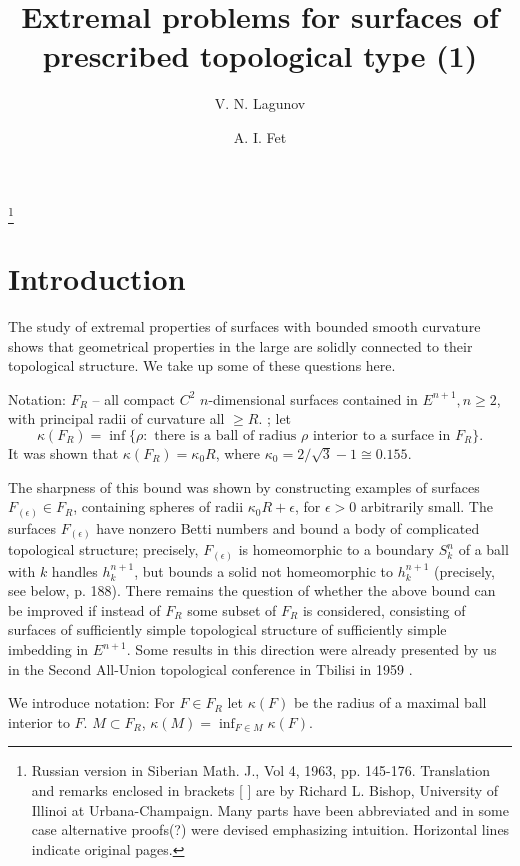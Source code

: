 \documentclass{amsart}
\theoremstyle{plain}
\theoremstyle{definition}
\begin{document}
\title{Extremal problems for surfaces of prescribed topological type (1)}
\author{V. N. Lagunov}
\author{A. I. Fet}
\thanks{Russian version in Siberian Math. J., Vol 4, 1963, pp. 145-176. Translation and remarks enclosed in brackets [ ] are by Richard L. Bishop, University of Illinoi at Urbana-Champaign. Many parts have been abbreviated and in some case alternative proofs(?) were devised emphasizing intuition. Horizontal lines indicate original pages.}
\maketitle
\section{Introduction}\label{sec:introduction}
The study of extremal properties of surfaces with bounded smooth curvature shows that geometrical properties in the large are solidly connected to their topological structure. We take up some of these questions here.

Notation: $F_R$ -- all compact $C^2$ $n$-dimensional surfaces
contained in $E^{n+1}, n \ge 2$, with principal radii of curvature
all $\ge R$. \cite{L1,L2,L3,L4}; let 
$$\kappa(F_R) = \inf \{\rho : \textrm{ there is a ball of radius }
\rho \textrm{ interior to a surface in } F_R\}.$$
It was shown that $\kappa (F_R) = \kappa_0R$, where $\kappa_0 =
2/\sqrt 3 -1 \cong 0.155$.

The sharpness of this bound was shown by constructing examples
of surfaces $F_{(\epsilon)} \in F_R$, containing spheres of radii
$\kappa_0R+\epsilon$, for $\epsilon > 0$ arbitrarily small. The
surfaces $F_{(\epsilon)}$ have nonzero Betti numbers and bound
a body of complicated topological structure; precisely,
$F_{(\epsilon)}$ is homeomorphic to a boundary $S^n_k$ of a
ball with $k$ handles $h^{n+1}_k$, but bounds a solid not
homeomorphic to $h^{n+1}_k$ (precisely, see below, p. 188).
There remains the question of whether the above bound can
be improved if instead of $F_R$ some subset of $F_R$ is
considered, consisting of surfaces of sufficiently simple 
topological structure of sufficiently simple imbedding in
$E^{n+1}$. Some results in this direction were already presented
by us in the Second All-Union topological conference in Tbilisi in
1959 \cite{LF}.

We introduce notation: For $F\in F_R$ let $\kappa(F)$ be the radius
of a maximal ball interior to $F$. $M \subset F_R$, $\kappa(M) =
\inf_{F\in M} \kappa(F)$.
\end{document}
